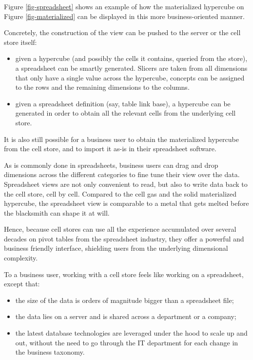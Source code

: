 \documentclass{acm_proc_article-sp}
\begin{document}
Figure \ref{fig-spreadsheet} shows an example of how the materialized hypercube on Figure \ref{fig-materialized} can be displayed in this more business-oriented manner.

Concretely, the construction of the view can be pushed to the server or the cell store itself:

\begin{itemize}
\item given a hypercube (and possibly the cells it contains, queried from the store), a spreadsheet can be smartly generated. Slicers are taken from all dimensions that only have a single value across the hypercube, concepts can be assigned to the rows and the remaining dimensions to the columns.
\item given a spreadsheet definition (say, table link base), a hypercube can be generated in order to obtain all the relevant cells from the underlying cell store.
\end{itemize}

It is also still possible for a business user to obtain the materialized hypercube from the cell store, and to import it as-is in their spreadsheet software.

As is commonly done in spreadsheets, business users can drag and drop dimensions across the different categories to fine tune their view over the data. Spreadsheet views are not only convenient to read, but also to write data back to the cell store, cell by cell. Compared to the cell gas and the solid materialized hypercube, the spreadsheet view is comparable to a metal that gets melted before the blacksmith can shape it at will.

Hence, because cell stores can use all the experience accumulated over several decades on pivot tables from the spreadsheet industry, they offer a powerful and business friendly interface, shielding users from the underlying dimensional complexity.

To a business user, working with a cell store feels like working on a spreadsheet, except that:

\begin{itemize}
\item the size of the data is orders of magnitude bigger than a spreadsheet file;
\item the data lies on a server and is shared across a department or a company;
\item the latest database technologies are leveraged under the hood to scale up and out, without the need to go through the IT department for each change in the business taxonomy.
\end{itemize}
\end{document}
